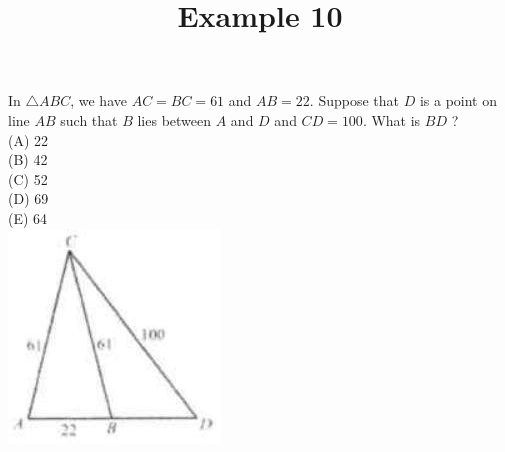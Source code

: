\documentclass{article}
\title{Example 10}
\date{}
\begin{document}
\maketitle

In \(\triangle A B C\), we have \(A C=B C=61\) and \(A B=22\). Suppose that \(D\) is a point on line \(A B\) such that \(B\) lies between \(A\) and \(D\) and \(C D=100\). What is \(B D\) ?\\
(A) 22\\
(B) 42\\
(C) 52\\
(D) 69\\
(E) 64\\
\centering
\includegraphics[width=\textwidth]{images/problem_image_1.jpg}
\end{document}
